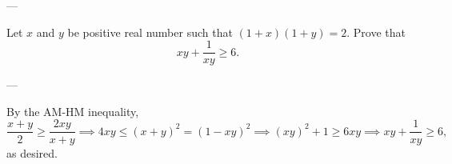 
---

Let $x$ and $y$ be positive real number such that $(1+x)(1+y)=2$. Prove that \[xy+\frac1{xy}\ge6.\]

---

By the AM-HM inequality, \[\frac{x+y}2\ge\frac{2xy}{x+y}\implies4xy\le(x+y)^2=(1-xy)^2\implies(xy)^2+1\ge6xy\implies xy+\frac1{xy}\ge6,\]
as desired.
